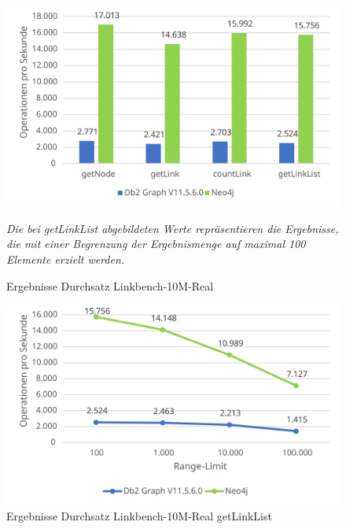 \begin{figure}[!ht]
    \centering
    \includegraphics[width=\textwidth]{images/diagramme/linkbench_10m_real_durchsatz.pdf}
    \caption{Ergebnisse Durchsatz Linkbench-10M-Real}
    \label{fig:durchsatz:linkbench_10m_real}
    \vspace{1em}
    \textit{Die bei getLinkList abgebildeten Werte repräsentieren die Ergebnisse, die mit einer Begrenzung der Ergebnismenge auf maximal 100 Elemente erzielt werden.}
\end{figure}

\begin{figure}[!ht]
    \centering
    \includegraphics[width=\textwidth]{images/diagramme/limit_absolute_durchsatz_real_10m.pdf}
    \caption{Ergebnisse Durchsatz Linkbench-10M-Real getLinkList}
    \label{fig:durchsatz:linkbench_10m_real:rl}
\end{figure}


